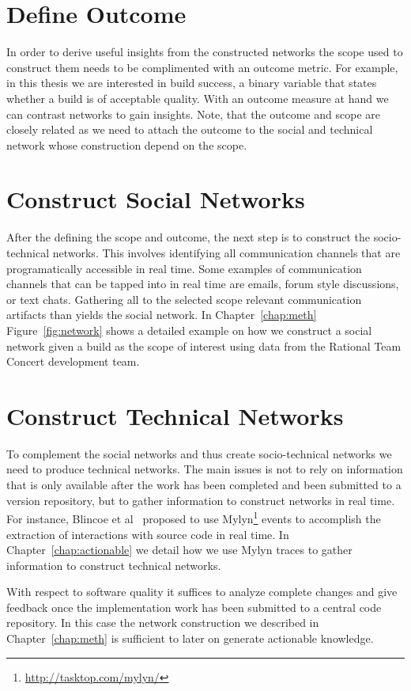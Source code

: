 \section{Define Outcome}
In order to derive useful insights from the constructed networks the scope used to construct them needs to be complimented with an outcome metric.
For example, in this thesis we are interested in build success, a binary variable that states whether a build is of acceptable quality.
With an outcome measure at hand we can contrast networks to gain insights.
Note, that the outcome and scope are closely related as we need to attach the outcome to the social and technical network whose construction depend on the scope.

\section{Construct Social Networks}
After the defining the scope and outcome, the next step is to construct the socio-technical networks.
This involves identifying all communication channels that are programatically accessible in real time.
Some examples of communication channels that can be tapped into in real time are emails, forum style discussions, or text chats.
Gathering all to the selected scope relevant communication artifacts than yields the social network.
In Chapter~\ref{chap:meth} Figure~\ref{fig:network} shows a detailed  example on how we construct a social network given a build as the scope of interest using data from the Rational Team Concert development team.

\section{Construct Technical Networks}
To complement the social networks and thus create socio-technical networks we need to produce technical networks.
The main issues is not to rely on information that is only available after the work has been completed and been submitted to a version repository, but to gather information to construct networks in real time.
For instance, Blincoe et al~\cite{blincoe:cscw:2012} proposed to use Mylyn\footnote{\url{http://tasktop.com/mylyn/}} events to accomplish the extraction of interactions with source code in real time.
In Chapter~\ref{chap:actionable} we detail how we use Mylyn traces to gather information to construct technical networks.

With respect to software quality it suffices to analyze complete changes and give feedback once the implementation work has been submitted to a central code repository.
In this case the network construction we described in Chapter~\ref{chap:meth} is sufficient to later on generate actionable knowledge.

